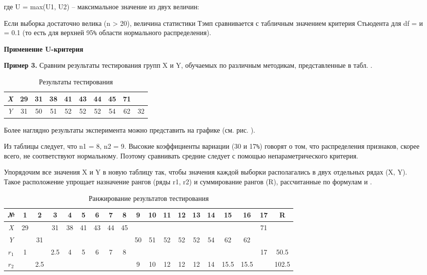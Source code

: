 \documentclass[12pt]{article}
\begin{document}
где U = max(U1, U2) – максимальное значение из двух величин:
                                           
Если выборка достаточно велика (n > 20), величина статистики Тэмп сравнивается с табличным значением критерия Стьюдента для df =  и  = 0.1 (то есть для верхней 95\verb!%! области нормального распределения).

\medskip
\textbf{Применение U-критерия}

\medskip
\textbf{Пример 3.} Сравним результаты тестирования групп X и Y, обучаемых по различным методикам, представленные в табл. . 

\begin{table}[h]
    \centering
    \caption{Результаты тестирования}
    \bigskip
    \begin{tabular}{|c|c|c|c|c|c|c|c|c|c|} \hline
         \textit{X} &29&31&38&41&43&44&45&71&  \\ \hline
         \textit{Y} &31&50&51&52&52&52&54&62&32  \\  \hline
    \end{tabular}
\end{table}
Более наглядно результаты эксперимента можно представить на графике (см. рис. ).
 
Из таблицы  следует, что n1 = 8, n2 = 9. Высокие коэффициенты вариации (30 и 17\verb!%!) говорят о том, что распределения признаков, скорее всего, не соответствуют нормальному. Поэтому сравнивать средние следует с помощью непараметрического критерия.

Упорядочим все значения X и Y в новую таблицу  так, чтобы значения каждой выборки располагались в двух отдельных рядах (X, Y). Такое расположение упрощает назначение рангов (ряды r1, r2) и суммирование рангов (R), рассчитанные по формулам и .

\begin{table}[h]
    \centering
    \caption{Ранжирование результатов тестирования}
    \bigskip
    \begin{tabular}{|c|c|c|c|c|c|c|c|c|c|c|c|c|c|c|c|c|c|c|} \hline
        \textit{№} &1&2&3&4&5&6&7&8&9&10&11&12&13&14&15&16&17&R \\ \hline
        \textit{X} &29&&31&38&41&43&44&45&&&&&&&&&71&  \\ \hline
        \textit{Y} &&31&&&&&&&50&51&52&52&52&54&62&62&&  \\  \hline
        \textit{$r_1$} &1&&2.5&4&5&6&7&8&&&&&&&&&17&50.5  \\  \hline
        \textit{$r_2$} &&2.5&&&&&&&9&10&12&12&12&14&15.5&15.5&&102.5  \\  \hline
    \end{tabular}
\end{table}
\end{document}
